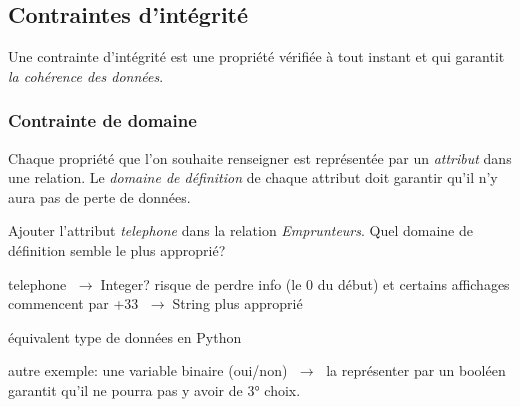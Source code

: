\documentclass[a4paper,11pt]{article}
\begin{document}
\begin{Form}
\subsection{Contraintes d'intégrité}
Une contrainte d'intégrité est une propriété vérifiée à tout instant et qui garantit \emph{la cohérence des données}.
\subsubsection{Contrainte de domaine}
Chaque propriété que l'on souhaite renseigner est représentée par un \emph{attribut} dans une relation. Le \emph{domaine de définition} de chaque attribut doit garantir qu'il n'y aura pas de perte de données.
\begin{activite}
Ajouter l'attribut \emph{telephone} dans la relation \emph{Emprunteurs}. Quel domaine de définition semble le plus approprié?
\end{activite}
\begin{commentprof}
telephone $\;\rightarrow\;$Integer? risque de perdre info (le 0 du début) et certains affichages commencent par +33 $\;\rightarrow\;$String plus approprié

équivalent type de données en Python

autre exemple: une variable binaire (oui/non) $\;\rightarrow\;$ la représenter par un booléen garantit qu'il ne pourra pas y avoir de 3° choix.
\end{commentprof}

\end{Form}
\end{document}
